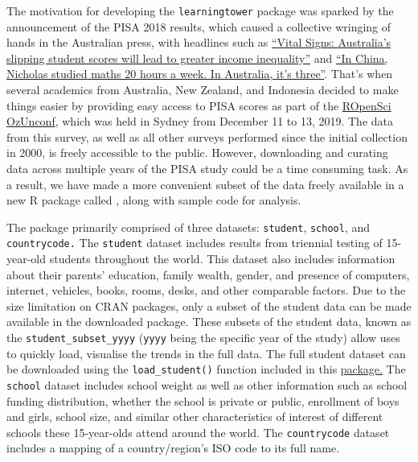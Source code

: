 The motivation for developing the \texttt{learningtower} package was
sparked by the announcement of the PISA 2018 results, which caused a
collective wringing of hands in the Australian press, with headlines
such as
\href{https://theconversation.com/vital-signs-australias-slipping-student-scores-will-lead-to-greater-income-inequality-128301}{``Vital
Signs: Australia's slipping student scores will lead to greater income
inequality''} and
\href{https://www.smh.com.au/education/in-china-nicholas-studied-maths-20-hours-a-week-in-australia-it-s-three-20191203-p53ggv.html}{``In
China, Nicholas studied maths 20 hours a week. In Australia, it's
three''}. That's when several academics from Australia, New Zealand, and
Indonesia decided to make things easier by providing easy access to PISA
scores as part of the \href{https://ozunconf19.ropensci.org/}{ROpenSci
OzUnconf}, which was held in Sydney from December 11 to 13, 2019. The
data from this survey, as well as all other surveys performed since the
initial collection in 2000, is freely accessible to the public. However,
downloading and curating data across multiple years of the PISA study
could be a time consuming task. As a result, we have made a more
convenient subset of the data freely available in a new R package called
, along with sample code for analysis.

The  package primarily comprised of three
datasets: \texttt{student}, \texttt{school}, and \texttt{countrycode.}
The \texttt{student} dataset includes results from triennial testing of
15-year-old students throughout the world. This dataset also includes
information about their parents' education, family wealth, gender, and
presence of computers, internet, vehicles, books, rooms, desks, and
other comparable factors. Due to the size limitation on CRAN packages,
only a subset of the student data can be made available in the
downloaded package. These subsets of the student data, known as the
\texttt{student\_subset\_yyyy} (\texttt{yyyy} being the specific year of
the study) allow uses to quickly load, visualise the trends in the full
data. The full student dataset can be downloaded using the
\texttt{load\_student()} function included in this
\href{https://kevinwang09.github.io/learningtower/}{package.} The
\texttt{school} dataset includes school weight as well as other
information such as school funding distribution, whether the school is
private or public, enrollment of boys and girls, school size, and
similar other characteristics of interest of different schools these
15-year-olds attend around the world. The \texttt{countrycode} dataset
includes a mapping of a country/region's ISO code to its full name.

